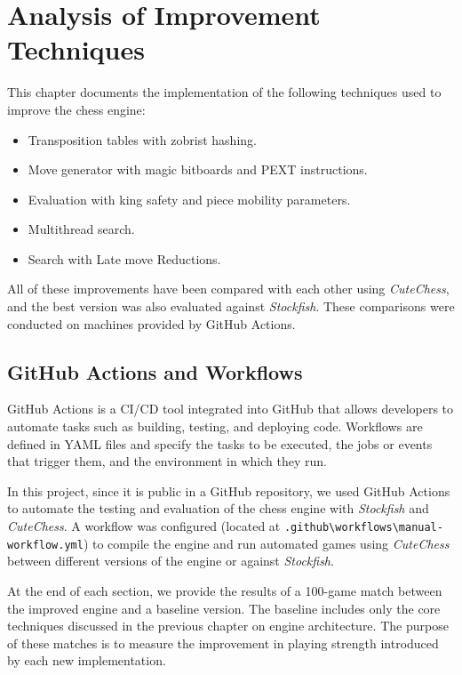 \chapter{Analysis of Improvement Techniques}\label{cap:analysisOfImprovements}

This chapter documents the implementation of the following techniques used to improve the chess engine:

\begin{itemize}[itemsep=1pt]
    \item Transposition tables with zobrist hashing.
    \item Move generator with magic bitboards and PEXT instructions.
    \item Evaluation with king safety and piece mobility parameters.
    \item Multithread search.
    \item Search with Late move Reductions.
\end{itemize}

All of these improvements have been compared with each other using \textit{CuteChess}, and the best version was also evaluated against \textit{Stockfish}. These comparisons were conducted on machines provided by GitHub Actions.

\section{GitHub Actions and Workflows}

GitHub Actions is a CI/CD tool integrated into GitHub that allows developers to automate tasks such as building, testing, and deploying code. Workflows are defined in YAML files and specify the tasks to be executed, the jobs or events that trigger them, and the environment in which they run.

\vspace{1em}

\noindent In this project, since it is public in a GitHub repository, we used GitHub Actions to automate the testing and evaluation of the chess engine with \textit{Stockfish} and \textit{CuteChess}. A workflow was configured (located at \texttt{.github\textbackslash{}workflows\textbackslash{}manual-workflow.yml}) to compile the engine and run automated games using \textit{CuteChess} between different versions of the engine or against \textit{Stockfish}.

\vspace{1em}

\noindent At the end of each section, we provide the results of a 100-game match between the improved engine and a baseline version. The baseline includes only the core techniques discussed in the previous chapter on engine architecture. The purpose of these matches is to measure the improvement in playing strength introduced by each new implementation.

